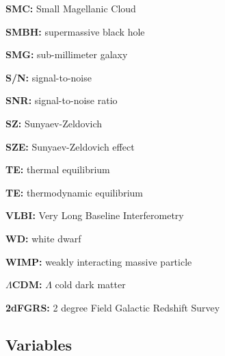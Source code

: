 \documentclass[a4paper,11pt]{article}
\begin{document}
{\noindent}\textbf{SMC:} Small Magellanic Cloud

{\noindent}\textbf{SMBH:} supermassive black hole

{\noindent}\textbf{SMG:} sub-millimeter galaxy

{\noindent}\textbf{S/N:} signal-to-noise

{\noindent}\textbf{SNR:} signal-to-noise ratio

{\noindent}\textbf{SZ:} Sunyaev-Zeldovich

{\noindent}\textbf{SZE:} Sunyaev-Zeldovich effect

{\noindent}\textbf{TE:} thermal equilibrium

{\noindent}\textbf{TE:} thermodynamic equilibrium

{\noindent}\textbf{VLBI:} Very Long Baseline Interferometry

{\noindent}\textbf{WD:} white dwarf

{\noindent}\textbf{WIMP:} weakly interacting massive particle

{\noindent}\textbf{$\Lambda$CDM:} $\Lambda$ cold dark matter

{\noindent}\textbf{2dFGRS:} 2 degree Field Galactic Redshift Survey








































\newpage
\subsection{Variables}
\end{document}
